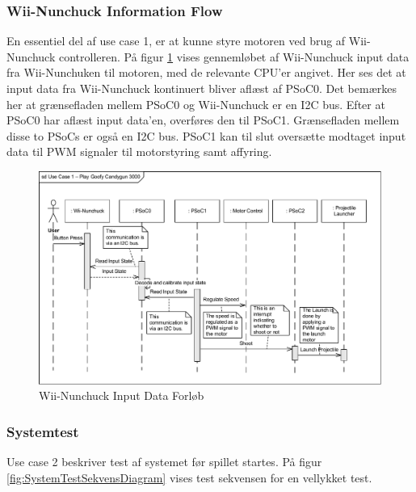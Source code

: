 \subsubsection{Wii-Nunchuck Information Flow}
En essentiel del af use case 1, er at kunne styre motoren ved brug af Wii-Nunchuck controlleren. På figur \ref{fig:WiiNunchuckSekvensDiagram} vises gennemløbet af Wii-Nunchuck input data fra Wii-Nunchuken til motoren, med de relevante CPU'er angivet. Her ses det at input data fra Wii-Nunchuck kontinuert bliver aflæst af PSoC0. Det bemærkes her at grænsefladen mellem PSoC0 og Wii-Nunchuck er en I2C bus. Efter at PSoC0 har aflæst input data'en, overføres den til PSoC1. Grænsefladen mellem disse to PSoCs er også en I2C bus. PSoC1 kan til slut oversætte modtaget input data til PWM signaler til motorstyring samt affyring.

\begin{figure}[H]
	\centering
	\includegraphics[width=\textwidth] {Systemarkitektur/images/SequenceDiagramUC1}
	\caption{Wii-Nunchuck Input Data Forløb}
	\label{fig:WiiNunchuckSekvensDiagram}
\end{figure}

\subsubsection{Systemtest}
Use case 2 beskriver test af systemet før spillet startes. På figur \ref{fig:SystemTestSekvensDiagram} vises test sekvensen for en vellykket test. 

